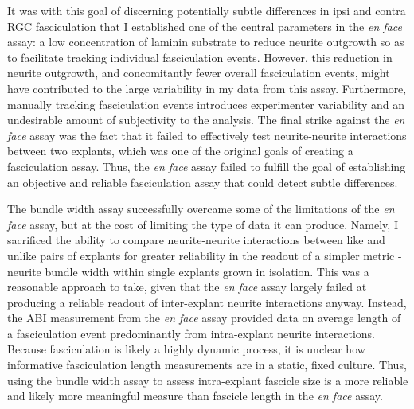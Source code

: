 It was with this goal of discerning potentially subtle differences in ipsi and contra RGC fasciculation that I established one of the central parameters in the \emph{en face} assay: a low concentration of laminin substrate to reduce neurite outgrowth so as to facilitate tracking individual fasciculation events.
However, this reduction in neurite outgrowth, and concomitantly fewer overall fasciculation events, might have contributed to the large variability in my data from this assay.
Furthermore, manually tracking fasciculation events introduces experimenter variability and an undesirable amount of subjectivity to the analysis.
The final strike against the \emph{en face} assay was the fact that it failed to effectively test neurite-neurite interactions between two explants, which was one of the original goals of creating a fasciculation assay.
Thus, the \emph{en face} assay failed to fulfill the goal of establishing an objective and reliable fasciculation assay that could detect subtle differences.

The bundle width assay successfully overcame some of the limitations of the \emph{en face} assay, but at the cost of limiting the type of data it can produce.
Namely, I sacrificed the ability to compare neurite-neurite interactions between like and unlike pairs of explants for greater reliability in the readout of a simpler metric - neurite bundle width within single explants grown in isolation.
This was a reasonable approach to take, given that the \emph{en face} assay largely failed at producing a reliable readout of inter-explant neurite interactions anyway.
Instead, the ABI measurement from the \emph{en face} assay provided data on average length of a fasciculation event predominantly from intra-explant neurite interactions.
Because fasciculation is likely a highly dynamic process, it is unclear how informative fasciculation length measurements are in a static, fixed culture.
Thus, using the bundle width assay to assess intra-explant fascicle size is a more reliable and likely more meaningful measure than fascicle length in the \emph{en face} assay.

